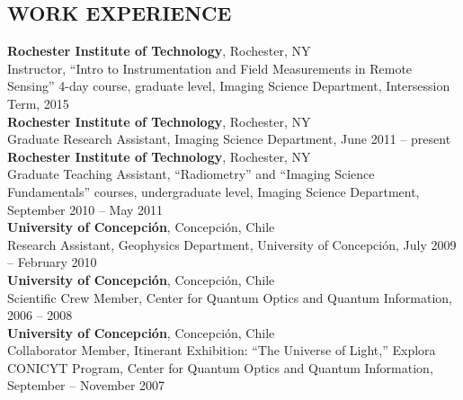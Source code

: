 \documentclass[11pt]{res} %
\begin{document}
\begin{resume}
\vspace{-0.1in}
\section{WORK EXPERIENCE}
\vspace{0.1in}
{\bf Rochester Institute of Technology}, Rochester, NY\\
Instructor, ``Intro to Instrumentation and Field Measurements in Remote Sensing'' 4-day course, graduate level, Imaging Science Department, Intersession Term, 2015
\vspace{0.1in}\\
{\bf Rochester Institute of Technology}, Rochester, NY\\
Graduate Research Assistant, Imaging Science Department, June 2011 -- present
\vspace{0.1in}\\
{\bf Rochester Institute of Technology}, Rochester, NY\\
Graduate Teaching Assistant, ``Radiometry'' and  ``Imaging Science Fundamentals'' courses, undergraduate level, Imaging Science Department, September 2010 -- May 2011
\vspace{0.1in}\\
{\bf University of Concepci\'on}, Concepci\'on, Chile\\
Research Assistant, Geophysics Department, University of Concepci\'on, July 2009 -- February 2010
\vspace{-0.1in}\\
{\bf University of Concepci\'on}, Concepci\'on, Chile\\
Scientific Crew Member, Center for Quantum Optics and Quantum Information, 2006 -- 2008
\vspace{0.1in}\\
{\bf University of Concepci\'on}, Concepci\'on, Chile\\
Collaborator Member, Itinerant Exhibition: ``The Universe of Light,'' Explora CONICYT Program, Center for Quantum Optics and Quantum Information, September -- November 2007\\

\vspace{-0.1in}

\end{resume}
\end{document}
